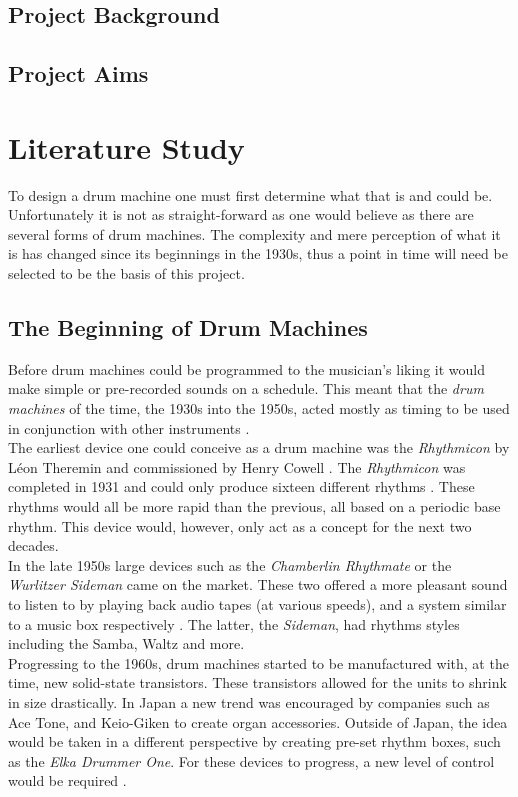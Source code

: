 \documentclass[12pt,a4paper]{report}
\begin{document}
\section{Project Background}
\section{Project Aims}

\chapter{Literature Study}
To design a drum machine one must first determine what that is and could be. Unfortunately it is not as straight-forward as one would believe as there are several forms of drum machines. The complexity and mere perception of what it is has changed since its beginnings in the 1930s, thus a point in time will need be selected to be the basis of this project.
\section{The Beginning of Drum Machines}
Before drum machines could be programmed to the musician's liking it would make simple or pre-recorded sounds on a schedule. This meant that the \textit{drum machines} of the time, the 1930s into the 1950s, acted mostly as timing to be used in conjunction with other instruments \cite{rhythmart}. \\
The earliest device one could conceive as a drum machine was the \textit{Rhythmicon} by L\'eon Theremin and commissioned by Henry Cowell \cite{rhythmart, beatgoeson}. The \textit{Rhythmicon} was completed in 1931 and could only produce sixteen different rhythms \cite{schedel}. These rhythms would all be more rapid than the previous, all based on a periodic base rhythm. This device would, however, only act as a concept for the next two decades. \\
In the late 1950s large devices such as the \textit{Chamberlin Rhythmate} or the \textit{Wurlitzer Sideman} came on the market. These two offered a more pleasant sound to listen to by playing back audio tapes (at various speeds), and a system similar to a music box respectively \cite{rhythmart, beatgoeson}. The latter, the \textit{Sideman}, had rhythms styles including the Samba, Waltz and more\cite{WangOliver2014Htdm}. \\
Progressing to the 1960s, drum machines started to be manufactured with, at the time, new solid-state transistors. These transistors allowed for the units to shrink in size drastically. In Japan a new trend was encouraged by companies such as Ace Tone, and Keio-Giken to create organ accessories. Outside of Japan, the idea would be taken in a different perspective by creating pre-set rhythm boxes, such as the \textit{Elka Drummer One}. For these devices to progress, a new level of control would be required \cite{rhythmart}.
\end{document}
